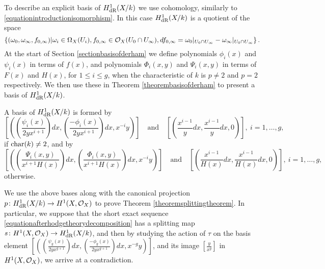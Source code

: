 To describe an explicit basis of $H_{\text {dR}}^1(X/k)$ we use \cech cohomology, similarly to \eqref{equationintroductionisomorphism}.
In this case $H_{\text {dR}}^1(X/k)$ is a quotient of the space 
    \begin{equation*}
    \left\{(\omega_0, \omega_\infty, f_{0,\infty}) | \omega_i\in \Omega_X(U_i), f_{0,\infty}\in {\cal O}_X(U_0 \cap U_\infty), df_{0,\infty} = \omega_0|_{U_0\cap U_\infty} - \omega_\infty|_{U_0\cap U_\infty} \right\}.
    \end{equation*}
At the start of Section \ref{sectionbasisofderham} we define polynomials $\phi_i(x)$ and $\psi_i(x)$ in terms of $f(x)$, and polynomials $\Phi_i(x,y)$ and $\Psi_i(x,y)$ in terms of $F(x)$ and $H(x)$, for $1 \leq i \leq g$, when the characteristic of $k$ is $p \neq 2$ and $p = 2$ respectively.
We then use these in Theorem \ref{theorembasisofderham} to present a basis of $H_{\text {dR}}^1(X/k)$.
    
    \begin{unnumthm}
    A basis of $H_{\text {dR}}^1(X/k)$ is formed by 
        \begin{equation*}
         \left[ \left( \left( \frac{\psi_i(x)}{2yx^{i+1}}\right) dx, \left(\frac{-\phi_i(x)}{2yx^{i+1}}\right) dx, x^{-i}y \right)\right] 
    \quad \text{and} \quad
         \left[ \left( \frac{x^{i-1}}{y} dx , \frac{x^{i-1}}{y} dx, 0 \right)\right] ,\ i = 1,\ldots ,g,
        \end{equation*}
   if $\operatorname{char}(k) \neq 2$, and by 
        \begin{equation*}
        \left[ \left( \left(\frac{\Psi_i(x,y)}{x^{i+1}H(x)}\right) dx, \left( \frac{\Phi_i(x,y)}{x^{i+1}H(x)} \right) dx, x^{-i}y \right)\right] 
    \quad \text{and} \quad
        \left[ \left( \frac{x^{i-1}}{H(x)} dx, \frac{x^{i-1}}{H(x)} dx, 0 \right)\right],\ i=1, \ldots, g,
        \end{equation*}
    otherwise.
    \end{unnumthm}

We use the above bases along with the canonical projection $p\colon H_{\text {dR}}^1(X/k) \rightarrow H^1(X,\mathcal{O}_X)$ to prove Theorem \ref{theoremsplittingtheorem}.
In particular, we suppose that the short exact sequence \ref{equationafterhodgetheorydecomposition} has a splitting map $s \colon H^1(X,\mathcal{O}_X) \rightarrow H_{\text {dR}}^1(X/k)$, and then by studying the action of $\tau$ on the basis element $\left[ \left( \left( \frac{\psi_g(x)}{2yx^{g+1}}\right) dx, \left(\frac{-\phi_g(x)}{2yx^{g+1}}\right) dx, x^{-g}y \right)\right]$, and its image $\left[ \frac{y}{x^g} \right]$ in $H^1(X,\mathcal{O}_X)$, we arrive at a contradiction.



